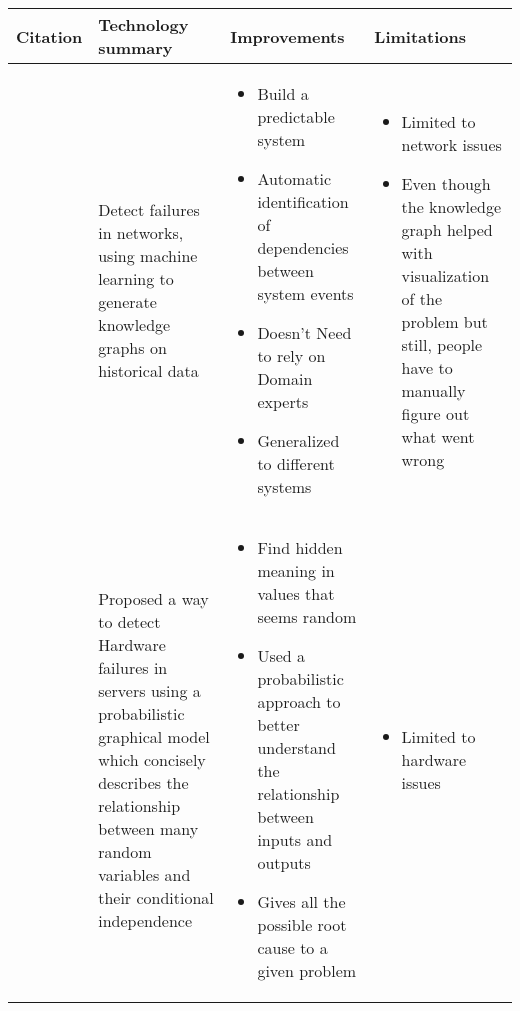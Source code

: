 \begin{longtable}{| p{20mm} | p{43mm} | p{43mm} | p{43mm} |}
\hline
  \textbf{Citation} &
  \textbf{Technology summary} &
  \textbf{Improvements} &
  \textbf{Limitations} \\ \hline
  \cite{gonzalez2017root} &
  Detect failures in networks, using machine learning to generate knowledge graphs on historical data &
  \vspace{-8mm}
  \begin{itemize}[leftmargin=*,noitemsep,nolistsep] 
    \item Build a predictable system
    \item Automatic identification of dependencies between system events
    \item Doesn't Need to rely on Domain experts
    \item Generalized to different systems
  \vspace{-7mm}
  \end{itemize} &
  \vspace{-8mm}
  \begin{itemize}[leftmargin=*,noitemsep,nolistsep] 
    \item Limited to network issues
    \item Even though the knowledge graph helped with visualization of the problem but still, people have to manually figure out what went wrong
  \vspace{-7mm}
  \end{itemize} \\ \hline
  \cite{chigurupati2017root} &
  Proposed a way to detect Hardware failures in servers using a probabilistic graphical model which concisely describes the relationship between many random variables and their conditional independence &
  \vspace{-8mm}
  \begin{itemize}[leftmargin=*,noitemsep,nolistsep] 
    \item Find hidden meaning in values that seems random
    \item Used a probabilistic approach to better understand the relationship between inputs and outputs
    \item Gives all the possible root cause to a given problem
  \vspace{-7mm}
  \end{itemize} &
  \vspace{-8mm}
  \begin{itemize}[leftmargin=*,noitemsep,nolistsep] 
    \item Limited to hardware issues

\end{itemize}
\end{longtable}
